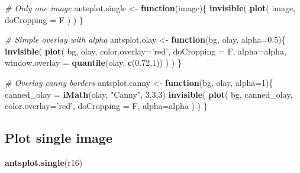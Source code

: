 \documentclass[]{tufte-handout}
\newenvironment{Shaded}{}{}
\newcommand{\CommentTok}[1]{\textcolor[rgb]{0.38,0.63,0.69}{\textit{#1}}}
\newcommand{\ControlFlowTok}[1]{\textcolor[rgb]{0.00,0.44,0.13}{\textbf{#1}}}
\newcommand{\DataTypeTok}[1]{\textcolor[rgb]{0.56,0.13,0.00}{#1}}
\newcommand{\DecValTok}[1]{\textcolor[rgb]{0.25,0.63,0.44}{#1}}
\newcommand{\FloatTok}[1]{\textcolor[rgb]{0.25,0.63,0.44}{#1}}
\newcommand{\KeywordTok}[1]{\textcolor[rgb]{0.00,0.44,0.13}{\textbf{#1}}}
\newcommand{\NormalTok}[1]{#1}
\newcommand{\StringTok}[1]{\textcolor[rgb]{0.25,0.44,0.63}{#1}}
\begin{document}
\begin{Shaded}
\begin{Highlighting}[]
\CommentTok{# Only one image}
\NormalTok{antsplot.single <-}\StringTok{ }\ControlFlowTok{function}\NormalTok{(image)\{}
  \KeywordTok{invisible}\NormalTok{(}
    \KeywordTok{plot}\NormalTok{(}
\NormalTok{      image,}
      \DataTypeTok{doCropping =}\NormalTok{ F}
\NormalTok{    )  }
\NormalTok{  )}
\NormalTok{\}}


\CommentTok{# Simple overlay with alpha}
\NormalTok{antsplot.olay <-}\StringTok{ }\ControlFlowTok{function}\NormalTok{(bg, olay, }\DataTypeTok{alpha=}\FloatTok{0.5}\NormalTok{)\{}
  \KeywordTok{invisible}\NormalTok{(}
    \KeywordTok{plot}\NormalTok{(}
\NormalTok{      bg, olay,}
      \DataTypeTok{color.overlay=}\StringTok{'red'}\NormalTok{,}
      \DataTypeTok{doCropping =}\NormalTok{ F,}
      \DataTypeTok{alpha=}\NormalTok{alpha,}
      \DataTypeTok{window.overlay =} \KeywordTok{quantile}\NormalTok{(olay, }\KeywordTok{c}\NormalTok{(}\FloatTok{0.72}\NormalTok{,}\DecValTok{1}\NormalTok{))}
\NormalTok{    )  }
\NormalTok{  )}
\NormalTok{\}}


\CommentTok{# Overlay canny borders}
\NormalTok{antsplot.canny <-}\StringTok{ }\ControlFlowTok{function}\NormalTok{(bg, olay, }\DataTypeTok{alpha=}\DecValTok{1}\NormalTok{)\{}
\NormalTok{  canned_olay =}\StringTok{ }\KeywordTok{iMath}\NormalTok{(olay, }\StringTok{"Canny"}\NormalTok{, }\DecValTok{3}\NormalTok{,}\DecValTok{3}\NormalTok{,}\DecValTok{3}\NormalTok{)}
  \KeywordTok{invisible}\NormalTok{(}
    \KeywordTok{plot}\NormalTok{(}
\NormalTok{      bg, canned_olay,}
      \DataTypeTok{color.overlay=}\StringTok{'red'}\NormalTok{,}
      \DataTypeTok{doCropping =}\NormalTok{ F,}
      \DataTypeTok{alpha=}\NormalTok{alpha}
\NormalTok{    )  }
\NormalTok{  )}
\NormalTok{\}}
\end{Highlighting}
\end{Shaded}

\hypertarget{plot-single-image}{%
\subsection{Plot single image}\label{plot-single-image}}

\begin{Shaded}
\begin{Highlighting}[]
\KeywordTok{antsplot.single}\NormalTok{(r16)}
\end{Highlighting}
\end{Shaded}
\end{document}
